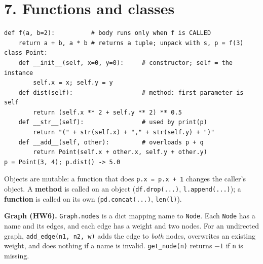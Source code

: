 \documentclass[10pt]{article}
\newcommand{\code}[1]{\lstinline[basicstyle=\ttfamily\small]{#1}}
\begin{document}
\section*{7. Functions and classes}
\begin{lstlisting}
def f(a, b=2):          # body runs only when f is CALLED
    return a + b, a * b # returns a tuple; unpack with s, p = f(3)
class Point:
    def __init__(self, x=0, y=0):     # constructor; self = the instance
        self.x = x; self.y = y
    def dist(self):                   # method: first parameter is self
        return (self.x ** 2 + self.y ** 2) ** 0.5
    def __str__(self):                # used by print(p)
        return "(" + str(self.x) + "," + str(self.y) + ")"
    def __add__(self, other):         # overloads p + q
        return Point(self.x + other.x, self.y + other.y)
p = Point(3, 4); p.dist() -> 5.0
\end{lstlisting}
Objects are mutable: a function that does \code{p.x = p.x + 1} changes the caller's object. A \textbf{method} is called on an object (\code{df.drop(...)}, \code{l.append(...)}); a \textbf{function} is called on its own (\code{pd.concat(...)}, \code{len(l)}).

\textbf{Graph (HW6).} \code{Graph.nodes} is a dict mapping name to \code{Node}. Each \code{Node} has a name and its edges, and each edge has a weight and two nodes. For an undirected graph, \code{add_edge(n1, n2, w)} adds the edge to \emph{both} nodes, overwrites an existing weight, and does nothing if a name is invalid. \code{get_node(n)} returns $-1$ if \code{n} is missing.

\end{document}
